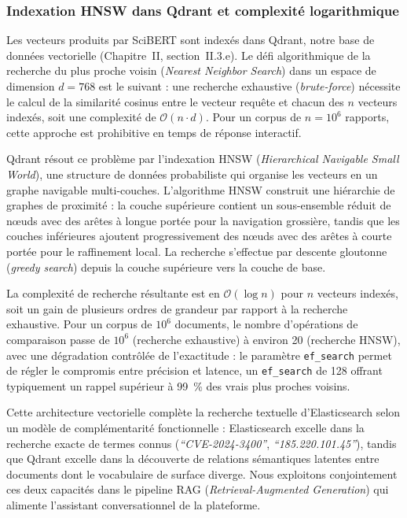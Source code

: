 \subsubsection{Indexation HNSW dans Qdrant et complexité logarithmique}

Les vecteurs produits par SciBERT sont indexés dans Qdrant, notre base de données vectorielle (Chapitre~II, section~II.3.e). Le défi algorithmique de la recherche du plus proche voisin (\textit{Nearest Neighbor Search}) dans un espace de dimension $d = 768$ est le suivant : une recherche exhaustive (\textit{brute-force}) nécessite le calcul de la similarité cosinus entre le vecteur requête et chacun des $n$ vecteurs indexés, soit une complexité de $\mathcal{O}(n \cdot d)$. Pour un corpus de $n = 10^6$ rapports, cette approche est prohibitive en temps de réponse interactif.

Qdrant résout ce problème par l'indexation HNSW (\textit{Hierarchical Navigable Small World}), une structure de données probabiliste qui organise les vecteurs en un graphe navigable multi-couches. L'algorithme HNSW construit une hiérarchie de graphes de proximité : la couche supérieure contient un sous-ensemble réduit de n\oe uds avec des arêtes à longue portée pour la navigation grossière, tandis que les couches inférieures ajoutent progressivement des n\oe uds avec des arêtes à courte portée pour le raffinement local. La recherche s'effectue par descente gloutonne (\textit{greedy search}) depuis la couche supérieure vers la couche de base.

La complexité de recherche résultante est en $\mathcal{O}(\log n)$ pour $n$ vecteurs indexés, soit un gain de plusieurs ordres de grandeur par rapport à la recherche exhaustive. Pour un corpus de $10^6$ documents, le nombre d'opérations de comparaison passe de $10^6$ (recherche exhaustive) à environ 20 (recherche HNSW), avec une dégradation contrôlée de l'exactitude : le paramètre \texttt{ef\_search} permet de régler le compromis entre précision et latence, un \texttt{ef\_search} de 128 offrant typiquement un rappel supérieur à 99~\% des vrais plus proches voisins.

Cette architecture vectorielle complète la recherche textuelle d'Elasticsearch selon un modèle de complémentarité fonctionnelle : Elasticsearch excelle dans la recherche exacte de termes connus (\textit{``CVE-2024-3400''}, \textit{``185.220.101.45''}), tandis que Qdrant excelle dans la découverte de relations sémantiques latentes entre documents dont le vocabulaire de surface diverge. Nous exploitons conjointement ces deux capacités dans le pipeline RAG (\textit{Retrieval-Augmented Generation}) qui alimente l'assistant conversationnel de la plateforme.




